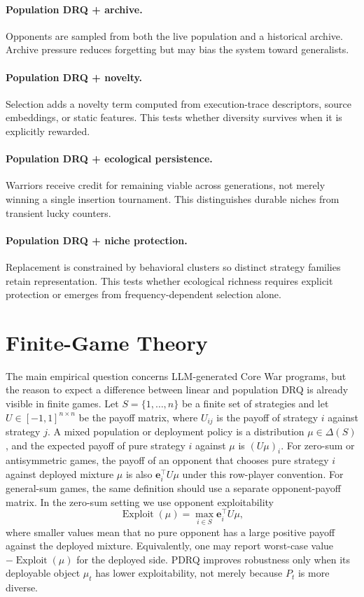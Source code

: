 \documentclass[11pt]{article}
\begin{document}
\paragraph{Population DRQ + archive.}
Opponents are sampled from both the live population and a historical archive. Archive pressure reduces forgetting but may bias the system toward generalists.

\paragraph{Population DRQ + novelty.}
Selection adds a novelty term computed from execution-trace descriptors, source embeddings, or static features. This tests whether diversity survives when it is explicitly rewarded.

\paragraph{Population DRQ + ecological persistence.}
Warriors receive credit for remaining viable across generations, not merely winning a single insertion tournament. This distinguishes durable niches from transient lucky counters.

\paragraph{Population DRQ + niche protection.}
Replacement is constrained by behavioral clusters so distinct strategy families retain representation. This tests whether ecological richness requires explicit protection or emerges from frequency-dependent selection alone.

\section{Finite-Game Theory}
\label{sec:finite_game_theory}

The main empirical question concerns LLM-generated Core War programs, but the reason to expect a difference between linear and population DRQ is already visible in finite games. Let $S=\{1,\ldots,n\}$ be a finite set of strategies and let $U\in[-1,1]^{n\times n}$ be the payoff matrix, where $U_{ij}$ is the payoff of strategy $i$ against strategy $j$. A mixed population or deployment policy is a distribution $\mu\in\Delta(S)$, and the expected payoff of pure strategy $i$ against $\mu$ is $(U\mu)_i$. For zero-sum or antisymmetric games, the payoff of an opponent that chooses pure strategy $i$ against deployed mixture $\mu$ is also $\mathbf{e}_i^\top U\mu$ under this row-player convention. For general-sum games, the same definition should use a separate opponent-payoff matrix. In the zero-sum setting we use opponent exploitability
\[
\operatorname{Exploit}(\mu)=\max_{i\in S}\mathbf{e}_i^\top U\mu,
\]
where smaller values mean that no pure opponent has a large positive payoff against the deployed mixture. Equivalently, one may report worst-case value $-\operatorname{Exploit}(\mu)$ for the deployed side. PDRQ improves robustness only when its deployable object $\mu_t$ has lower exploitability, not merely because $P_t$ is more diverse.
\end{document}
